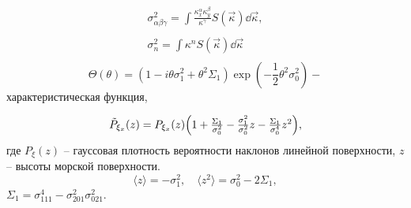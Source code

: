 \documentclass[10pt,pdf,hyperref={unicode}, dvipsnames]{beamer}
\newcommand{\mean}[1]{\langle#1\rangle}
\begin{document}
\begin{frame}[t]
\begin{figure}[h]
    \end{figure}    
    \begin{minipage}{0.45\linewidth}
        \footnotesize
        \begin{equation}
            \textstyle 
            \begin{gathered} \sigma^2_{\alpha \beta \gamma} =
                \int\limits_{} \frac{\kappa_x^\alpha
                \kappa_y^\beta}{\kappa^{\gamma}} S(\vec \kappa) \dd \vec
                \kappa,\\ \sigma_n^2 = \int\limits_{}^{} \kappa^n S(\vec
                \kappa) \dd \vec \kappa 
            \end{gathered}
        \end{equation}
        \begin{equation}
            \label{eq:char}
            \Theta(\theta) = (1 - i \theta \sigma_1^2 + \theta^2 \Sigma_1)
            \exp(-\frac{1}{2} \theta^2 \sigma_0^2)-
        \end{equation}
        характеристическая функция,
        \end{minipage}
    \hfill
    \begin{minipage}{0.45\linewidth}
        \footnotesize
        \begin{equation}
        \textstyle 
            \tilde P_{\xi_x}(z) = 
            P_{\xi_x}(z)\qty(1 + 
                            \frac{\Sigma_1}{\sigma_0^2} -
                            \frac{\sigma_1^2}{\sigma_0^2} z -
                            \frac{\Sigma_1}{\sigma_0^4}z^2), 
        \end{equation}
        где $P_\xi(z)$ -- гауссовая плотность вероятности наклонов линейной
    поверхности,  $z$ -- высоты морской поверхности.
        \begin{equation}
            \mean{z} = - \sigma_1^2, \quad \mean{z^2} = \sigma_0^2 - 2
            \Sigma_1,
        \end{equation}
        $\Sigma_1 = \sigma^4_{111} - \sigma_{201}^2 \sigma_{021}^2$.
    \end{minipage}
\end{frame}

\end{document}
